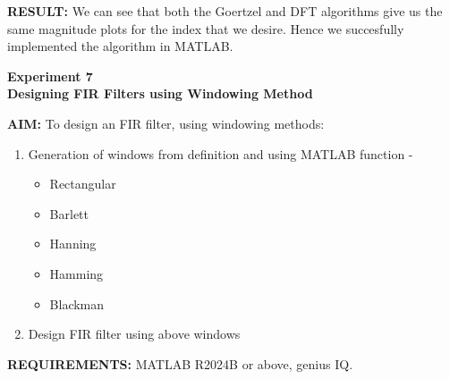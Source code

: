 \documentclass[12pt]{report}
\begin{document}
  \textbf{RESULT:} We can see that both the Goertzel and DFT algorithms give us the same magnitude plots for the index that we desire. Hence we succesfully implemented the algorithm in MATLAB.
  \newpage
  \begin{center}
    \textbf{\LARGE Experiment 7} \\
    \vspace{0.2cm}
    \textbf{\large Designing FIR Filters using Windowing Method}
  \end{center}

  \noindent \textbf{AIM:} To design an FIR filter, using windowing methods:
  \begin{enumerate}
    \item Generation of windows from definition and using MATLAB function - 
      \begin{itemize}
        \item Rectangular
        \item Barlett 
        \item Hanning 
        \item Hamming 
        \item Blackman
      \end{itemize}
    \item Design FIR filter using above windows
  \end{enumerate}

  \noindent \textbf{REQUIREMENTS:} MATLAB R2024B or above, genius IQ. \\ \\
\end{document}
